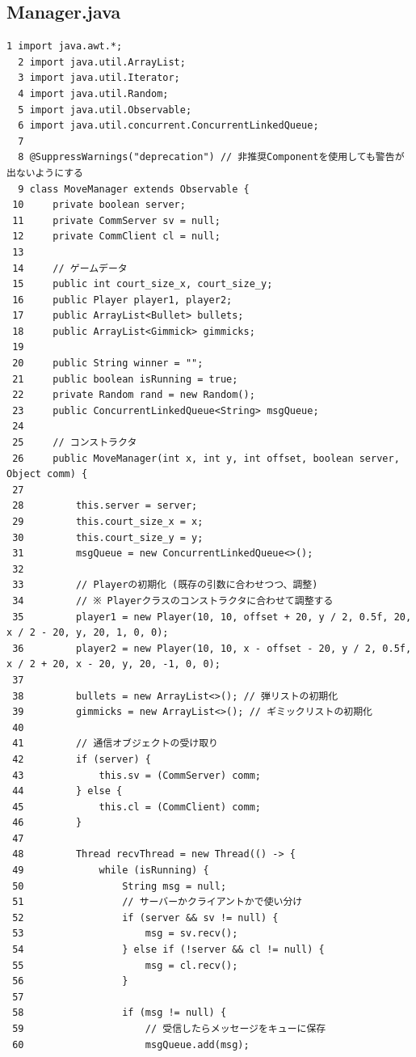 \documentclass[11pt,a4j]{jarticle}
\begin{document}
\subsection*{Manager.java}
\begin{small}
\begin{verbatim}
1 import java.awt.*;
  2 import java.util.ArrayList;
  3 import java.util.Iterator;
  4 import java.util.Random;
  5 import java.util.Observable;
  6 import java.util.concurrent.ConcurrentLinkedQueue;
  7 
  8 @SuppressWarnings("deprecation") // 非推奨Componentを使用しても警告が出ないようにする
  9 class MoveManager extends Observable {
 10     private boolean server;
 11     private CommServer sv = null;
 12     private CommClient cl = null;
 13 
 14     // ゲームデータ
 15     public int court_size_x, court_size_y;
 16     public Player player1, player2;
 17     public ArrayList<Bullet> bullets;
 18     public ArrayList<Gimmick> gimmicks;
 19 
 20     public String winner = "";
 21     public boolean isRunning = true;
 22     private Random rand = new Random();
 23     public ConcurrentLinkedQueue<String> msgQueue;
 24 
 25     // コンストラクタ
 26     public MoveManager(int x, int y, int offset, boolean server, Object comm) {
 27 
 28         this.server = server;
 29         this.court_size_x = x;
 30         this.court_size_y = y;
 31         msgQueue = new ConcurrentLinkedQueue<>();
 32 
 33         // Playerの初期化 (既存の引数に合わせつつ、調整)
 34         // ※ Playerクラスのコンストラクタに合わせて調整する
 35         player1 = new Player(10, 10, offset + 20, y / 2, 0.5f, 20, x / 2 - 20, y, 20, 1, 0, 0);
 36         player2 = new Player(10, 10, x - offset - 20, y / 2, 0.5f, x / 2 + 20, x - 20, y, 20, -1, 0, 0);
 37 
 38         bullets = new ArrayList<>(); // 弾リストの初期化
 39         gimmicks = new ArrayList<>(); // ギミックリストの初期化
 40 
 41         // 通信オブジェクトの受け取り
 42         if (server) {
 43             this.sv = (CommServer) comm;
 44         } else {
 45             this.cl = (CommClient) comm;
 46         }
 47 
 48         Thread recvThread = new Thread(() -> {
 49             while (isRunning) {
 50                 String msg = null;
 51                 // サーバーかクライアントかで使い分け
 52                 if (server && sv != null) {
 53                     msg = sv.recv();
 54                 } else if (!server && cl != null) {
 55                     msg = cl.recv();
 56                 }
 57 
 58                 if (msg != null) {
 59                     // 受信したらメッセージをキューに保存
 60                     msgQueue.add(msg);

\end{verbatim}
\end{small}
\end{document}
